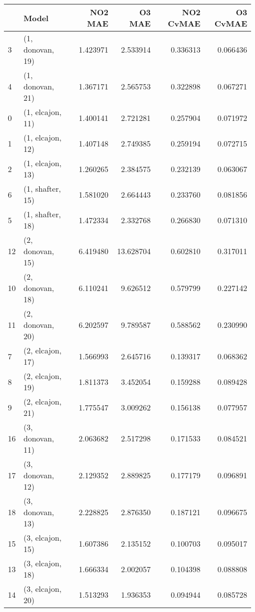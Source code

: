 \begin{tabular}{llrrrr}
\toprule
{} &             Model &   NO2 MAE &     O3 MAE &  NO2 CvMAE &  O3 CvMAE \\
\midrule
3  &  (1, donovan, 19) &  1.423971 &   2.533914 &   0.336313 &  0.066436 \\
4  &  (1, donovan, 21) &  1.367171 &   2.565753 &   0.322898 &  0.067271 \\
0  &  (1, elcajon, 11) &  1.400141 &   2.721281 &   0.257904 &  0.071972 \\
1  &  (1, elcajon, 12) &  1.407148 &   2.749385 &   0.259194 &  0.072715 \\
2  &  (1, elcajon, 13) &  1.260265 &   2.384575 &   0.232139 &  0.063067 \\
6  &  (1, shafter, 15) &  1.581020 &   2.664443 &   0.233760 &  0.081856 \\
5  &  (1, shafter, 18) &  1.472334 &   2.332768 &   0.266830 &  0.071310 \\
12 &  (2, donovan, 15) &  6.419480 &  13.628704 &   0.602810 &  0.317011 \\
10 &  (2, donovan, 18) &  6.110241 &   9.626512 &   0.579799 &  0.227142 \\
11 &  (2, donovan, 20) &  6.202597 &   9.789587 &   0.588562 &  0.230990 \\
7  &  (2, elcajon, 17) &  1.566993 &   2.645716 &   0.139317 &  0.068362 \\
8  &  (2, elcajon, 19) &  1.811373 &   3.452054 &   0.159288 &  0.089428 \\
9  &  (2, elcajon, 21) &  1.775547 &   3.009262 &   0.156138 &  0.077957 \\
16 &  (3, donovan, 11) &  2.063682 &   2.517298 &   0.171533 &  0.084521 \\
17 &  (3, donovan, 12) &  2.129352 &   2.889825 &   0.177179 &  0.096891 \\
18 &  (3, donovan, 13) &  2.228825 &   2.876350 &   0.187121 &  0.096675 \\
15 &  (3, elcajon, 15) &  1.607386 &   2.135152 &   0.100703 &  0.095017 \\
13 &  (3, elcajon, 18) &  1.666334 &   2.002057 &   0.104398 &  0.088808 \\
14 &  (3, elcajon, 20) &  1.513293 &   1.936353 &   0.094944 &  0.085728 \\
\bottomrule
\end{tabular}

